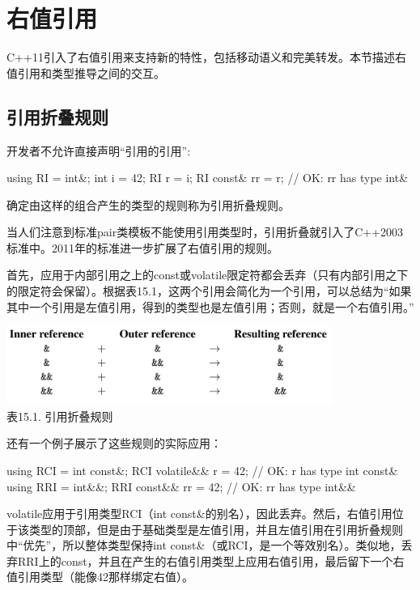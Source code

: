 \section{右值引用}

C++11引入了右值引用来支持新的特性，包括移动语义和完美转发。本节描述右值引用和类型推导之间的交互。

\subsection{引用折叠规则}

开发者不允许直接声明“引用的引用”:

\begin{cpp}
using RI = int&;
int i = 42;
RI r = i;
RI const& rr = r; // OK: rr has type int&
\end{cpp}

确定由这样的组合产生的类型的规则称为引用折叠规则。

\begin{notice}
当人们注意到标准pair类模板不能使用引用类型时，引用折叠就引入了C++2003标准中。2011年的标准进一步扩展了右值引用的规则。
\end{notice}

首先，应用于内部引用之上的const或volatile限定符都会丢弃（只有内部引用之下的限定符会保留）。根据表15.1，这两个引用会简化为一个引用，可以总结为“如果其中一个引用是左值引用，得到的类型也是左值引用；否则，就是一个右值引用。”

\begin{center}
\includegraphics[width=0.8\textwidth]{part2/ch15/images/1.png} \\
表15.1. 引用折叠规则
\end{center}

还有一个例子展示了这些规则的实际应用：

\begin{cpp}
using RCI = int const&;
RCI volatile&& r = 42; // OK: r has type int const&
using RRI = int&&;
RRI const&& rr = 42; // OK: rr has type int&&
\end{cpp}

volatile应用于引用类型RCI（int const\&的别名），因此丢弃。然后，右值引用位于该类型的顶部，但是由于基础类型是左值引用，并且左值引用在引用折叠规则中“优先”，所以整体类型保持int const\&（或RCI，是一个等效别名）。类似地，丢弃RRI上的const，并且在产生的右值引用类型上应用右值引用，最后留下一个右值引用类型（能像42那样绑定右值）。

